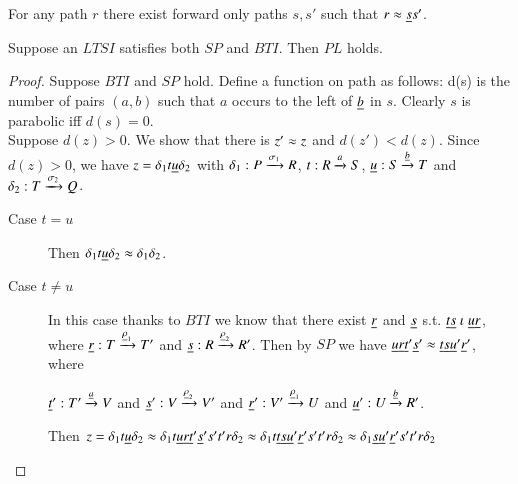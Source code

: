 








\begin{definition}
  For any path $r$ there exist forward only paths $s,s'$ such
  that $r \approx \underline{s}s'$.
\end{definition}

\begin{proposition}
  Suppose an $LTSI$ satisfies both $SP$ and $BTI$. Then $PL$ holds.
\end{proposition}
\begin{proof}
  Suppose $BTI$ and $SP$ hold. Define a function on path as follows: d(s) is the
  number of pairs $(a,b)$ such that $a$ occurs to the left of $\underline{b}$ in $s$.
  Clearly $s$ is parabolic iff $d(s)=0$. \\

  Suppose $d(z)>0$. We show that there is $z' \approx z$ and $d(z') < d(z)$.
  Since $d(z) > 0$, we have $z = \delta_1 t\underline{u}\delta_2$ with
  $\delta_1:P \xrightarrow[]{\sigma_1} R$,
  $t:R \xrightarrow[]{a} S$, $\underline{u}:S \xrightarrow[]{\underline{b}} T$ and $\delta_2:T \xrightarrow[]{\sigma_2} Q$.
  
    \begin{description}
    \item[Case $t = u$] Then $\delta_1 t\underline{u}\delta_2 \approx
      \delta_1\delta_2$.
    \item[Case $ t \neq  u$] In this case thanks to $BTI$ we know that
      there exist $\underline{r}$ and $\underline{s}$ s.t. $\underline{t} \underline{s} \mathrel{\iota} \underline{u} \underline{r}$, where
       $\underline{r}: T \xrightarrow[]{\underline{\rho}_1} T'$ and $\underline{s}: R \xrightarrow[]{\underline{\rho}_2} R'$.
      Then
      by $SP$ we have $\underline{u} \underline{r} \underline{t}' \underline{s}'
      \approx \underline{t} \underline{s} \underline{u}' \underline{r}'$, where 
      
       $\underline{t}': T' \xrightarrow[]{\underline{a}} V$ and $\underline{s}': V \xrightarrow[]{\underline{\rho}_2} V'$ 
       and 
       $\underline{r}': V' \xrightarrow[]{\underline{\rho}_1} U$ and $\underline{u}': U \xrightarrow[]{\underline{b}} R'$.
      
      Then $
      z = \delta_1 t \underline{u} \delta_2 \approx 
      \delta_1 t \underline{u} \underline{r} \underline{t}' \underline{s}' s' t' r \delta_2  \approx 
      \delta_1 t  \underline{t} \underline{s} \underline{u}' \underline{r}' s' t' r \delta_2   \approx 
      \delta_1 \underline{s} \underline{u}' \underline{r}' s' t' r \delta_2
      $ 
      
      
    \end{description}

  
\end{proof}

